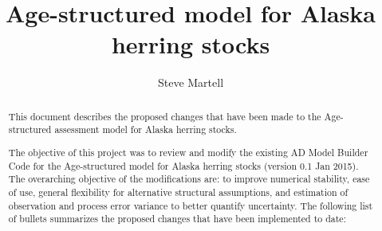 \documentclass[12pt,letterpaper]{article}
\title{Age-structured model for Alaska herring stocks}
\author{Steve Martell}
\begin{document}
  \maketitle
  \renewcommand{\abstractname}{Executive Summary}
  \begin{abstract}
    This document describes the proposed changes that have been made to the Age-structured assessment model for Alaska herring stocks. 

    The objective of this project was to review and modify the existing AD Model Builder Code for the Age-structured model for Alaska herring stocks (version 0.1 Jan 2015).  The overarching objective of the modifications are:  to improve numerical stability, ease of use, general flexibility for alternative structural assumptions, and estimation of observation and process error variance to better quantify uncertainty. The following list of bullets summarizes the proposed changes that have been implemented to date:


\end{abstract}
\end{document}
